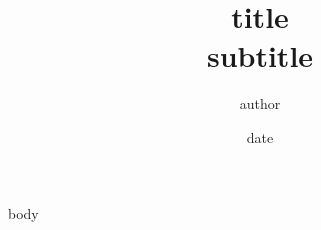 \documentclass[11pt]{article}
\title{ {{title}} \\[0.3em] \large {{subtitle}} }
\author{ {{author}} }
\date{ {{date}} }
\theoremstyle{remark}
\begin{document}
\maketitle
\thispagestyle{empty}
\tableofcontents
\newpage

{{body}}
\end{document}
